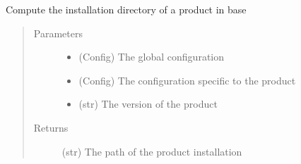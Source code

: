 \documentclass[a4paper,10pt,english]{sphinxmanual}
\begin{document}

\begin{fulllineitems}
\label{\detokenize{apidoc_src/src:src.product.get_base_install_dir}}
Compute the installation directory of a product in base
\begin{quote}\begin{description}
\item[{Parameters}] \leavevmode\begin{itemize}
\item {} 
 \textendash{} (Config) The global configuration

\item {} 
 \textendash{} (Config) 
The configuration specific to the product

\item {} 
 \textendash{} (str) The version of the product

\end{itemize}

\item[{Returns}] \leavevmode
(str) The path of the product installation

\end{description}\end{quote}

\end{fulllineitems}

\end{document}
